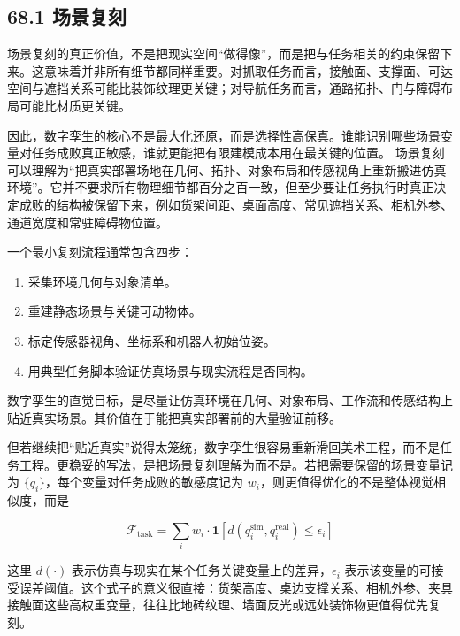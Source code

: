 \subsection*{68.1 场景复刻}


场景复刻的真正价值，不是把现实空间“做得像”，而是把与任务相关的约束保留下来。这意味着并非所有细节都同样重要。对抓取任务而言，接触面、支撑面、可达空间与遮挡关系可能比装饰纹理更关键；对导航任务而言，通路拓扑、门与障碍布局可能比材质更关键。

因此，数字孪生的核心不是最大化还原，而是选择性高保真。谁能识别哪些场景变量对任务成败真正敏感，谁就更能把有限建模成本用在最关键的位置。 场景复刻可以理解为“把真实部署场地在几何、拓扑、对象布局和传感视角上重新搬进仿真环境”。它并不要求所有物理细节都百分之百一致，但至少要让任务执行时真正决定成败的结构被保留下来，例如货架间距、桌面高度、常见遮挡关系、相机外参、通道宽度和常驻障碍物位置。

一个最小复刻流程通常包含四步：

\begin{enumerate}
\item 采集环境几何与对象清单。
\item 重建静态场景与关键可动物体。
\item 标定传感器视角、坐标系和机器人初始位姿。
\item 用典型任务脚本验证仿真场景与现实流程是否同构。
\end{enumerate}

数字孪生的直觉目标，是尽量让仿真环境在几何、对象布局、工作流和传感结构上贴近真实场景。其价值在于能把真实部署前的大量验证前移。

但若继续把“贴近真实”说得太笼统，数字孪生很容易重新滑回美术工程，而不是任务工程。更稳妥的写法，是把场景复刻理解为\texttt{}而不是\texttt{}。若把需要保留的场景变量记为 \(\{q_i\}\)，每个变量对任务成败的敏感度记为 \(w_i\)，则更值得优化的不是整体视觉相似度，而是

\begingroup
\scriptsize
\begin{equation*}
\mathcal{F}_{\text{task}}
=
\sum_i w_i \cdot \mathbf{1}[d(q_i^{\text{sim}}, q_i^{\text{real}}) \le \epsilon_i]
\end{equation*}
\endgroup

这里 \(d(\cdot)\) 表示仿真与现实在某个任务关键变量上的差异，\(\epsilon_i\) 表示该变量的可接受误差阈值。这个式子的意义很直接：货架高度、桌边支撑关系、相机外参、夹具接触面这些高权重变量，往往比地砖纹理、墙面反光或远处装饰物更值得优先复刻。

